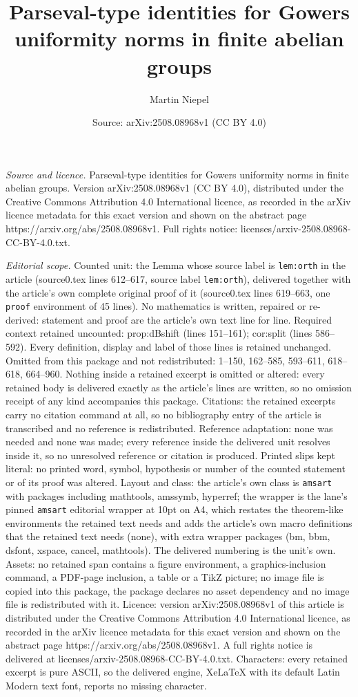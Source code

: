\documentclass[10pt,a4paper]{amsart}
\title[Parseval-type identities for Gowers uniformity norms in fini]{Parseval-type identities for Gowers uniformity norms in finite abelian groups}
\author{Martin Niepel}
\date{Source: arXiv:2508.08968v1 (CC BY 4.0)}
\begin{document}
\maketitle

\noindent\emph{Source and licence.} Parseval-type identities for Gowers uniformity norms in finite abelian groups. Version arXiv:2508.08968v1 (CC BY 4.0), distributed under the Creative Commons Attribution 4.0 International licence, as recorded in the arXiv licence metadata for this exact version and shown on the abstract page https://arxiv.org/abs/2508.08968v1. Full rights notice: licenses/arxiv-2508.08968-CC-BY-4.0.txt.\par\smallskip

\noindent\textit{Editorial scope.} Counted unit: the Lemma whose source label is \texttt{lem:orth} in the article (source0.tex lines 612--617, source label \texttt{lem:orth}), delivered together with the article's own complete original proof of it (source0.tex lines 619--663, one \texttt{proof} environment of 45 lines). No mathematics is written, repaired or re-derived: statement and proof are the article's own text line for line. Required context retained uncounted: prop:dBshift (lines 151--161); cor:split (lines 586--592). Every definition, display and label of those lines is retained unchanged. Omitted from this package and not redistributed: 1--150, 162--585, 593--611, 618--618, 664--960. Nothing inside a retained excerpt is omitted or altered: every retained body is delivered exactly as the article's lines are written, so no omission receipt of any kind accompanies this package. Citations: the retained excerpts carry no citation command at all, so no bibliography entry of the article is transcribed and no reference is redistributed. Reference adaptation: none was needed and none was made; every reference inside the delivered unit resolves inside it, so no unresolved reference or citation is produced. Printed slips kept literal: no printed word, symbol, hypothesis or number of the counted statement or of its proof was altered. Layout and class: the article's own class is \texttt{amsart} with packages including mathtools, amssymb, hyperref; the wrapper is the lane's pinned \texttt{amsart} editorial wrapper at 10pt on A4, which restates the theorem-like environments the retained text needs and adds the article's own macro definitions that the retained text needs (none), with extra wrapper packages (bm, bbm, dsfont, xspace, cancel, mathtools). The delivered numbering is the unit's own. Assets: no retained span contains a figure environment, a graphics-inclusion command, a PDF-page inclusion, a table or a TikZ picture; no image file is copied into this package, the package declares no asset dependency and no image file is redistributed with it. Licence: version arXiv:2508.08968v1 of this article is distributed under the Creative Commons Attribution 4.0 International licence, as recorded in the arXiv licence metadata for this exact version and shown on the abstract page https://arxiv.org/abs/2508.08968v1. A full rights notice is delivered at licenses/arxiv-2508.08968-CC-BY-4.0.txt. Characters: every retained excerpt is pure ASCII, so the delivered engine, XeLaTeX with its default Latin Modern text font, reports no missing character.
\end{document}
